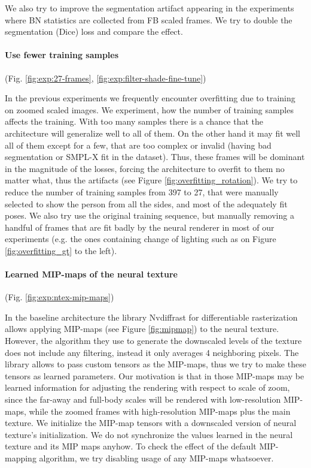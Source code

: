We also try to improve the segmentation artifact appearing in the experiments where BN statistics are collected from FB scaled frames. We try to double the segmentation (Dice) loss and compare the effect.

\vspace{-15pt}\paragraph{Use fewer training samples}(Fig. \ref{fig:exp:27-frames}, \ref{fig:exp:filter-shade-fine-tune})\mbox{}\nopagebreak

In the previous experiments we frequently encounter overfitting due to training on zoomed scaled images. We experiment, how the number of training samples affects the training. With too many samples there is a chance that the architecture will generalize well to all of them. On the other hand it may fit well all of them except for a few, that are too complex or invalid (having bad segmentation or SMPL-X fit in the dataset). Thus, these frames will be dominant in the magnitude of the losses, forcing the architecture to overfit to them no matter what, thus the artifacts (see Figure \ref{fig:overfitting_rotation}). We try to reduce the number of training samples from 397 to 27, that were manually selected to show the person from all the sides, and most of the adequately fit poses. We also try use the original training sequence, but manually removing a handful of frames that are fit badly by the neural renderer in most of our experiments (e.g. the ones containing change of lighting such as on Figure \ref{fig:overfitting_gt} to the left).

\vspace{-15pt}\paragraph{Learned MIP-maps of the neural texture}(Fig. \ref{fig:exp:ntex-mip-maps})\mbox{}\nopagebreak

In the baseline architecture the library Nvdiffrast \cite{aux:nvdiffrast20} for differentiable rasterization allows applying MIP-maps (see Figure \ref{fig:mipmap}) to the neural texture. However, the algorithm they use to generate the downscaled levels of the texture does not include any filtering, instead it only averages 4 neighboring pixels. The library allows to pass custom tensors as the MIP-maps, thus we try to make these tensors as learned parameters. Our motivation is that in those MIP-maps may be learned information for adjusting the rendering with respect to scale of zoom, since the far-away and full-body scales will be rendered with low-resolution MIP-maps, while the zoomed frames with high-resolution MIP-maps plus the main texture. We initialize the MIP-map tensors with a downscaled version of neural texture's initialization. We do not synchronize the values learned in the neural texture and its MIP maps anyhow. To check the effect of the default MIP-mapping algorithm, we try disabling usage of any MIP-maps whatsoever.

